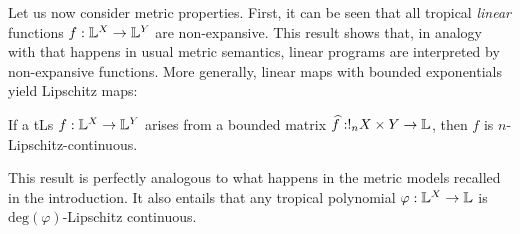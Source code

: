 \documentclass[submission,%
]{eptcs}
\begin{document}
%

Let us now consider metric properties. First, it can be seen that all tropical \emph{linear} functions $f: \mathbb{L}^{X}\to \mathbb{L}^{Y}$ are non-expansive. 
This result shows that, in analogy with that happens in usual metric semantics, linear programs are interpreted by non-expansive functions. 
More generally, linear maps with bounded exponentials yield Lipschitz maps:
\begin{proposition}\label{prop:boundedlip}
If a tLs $f: \mathbb{L}^{X}\to \mathbb{L}^{Y}$ arises from a bounded matrix $\widehat{f}:!_{n}X\times Y\to \mathbb{L}$, then $f$ is $n$-Lipschitz-continuous.
\end{proposition}
This result is perfectly analogous to what happens in the metric models recalled in the introduction.%
It also entails that any tropical polynomial $\varphi:\mathbb{L}^{X}\to\mathbb{L}$ is $\mathrm{deg}(\varphi)$-Lipschitz continuous.
\end{document}
